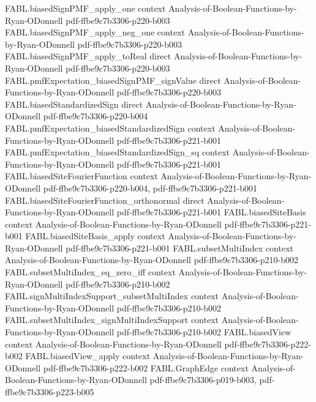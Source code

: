\begin{theorem}
\proofstep
  {FABL.biasedSignPMF_apply_one}
  {context}
  {Analysis-of-Boolean-Functions-by-Ryan-ODonnell}
  {pdf-ffbe9c7b3306-p220-b003}
\proofstep
  {FABL.biasedSignPMF_apply_neg_one}
  {context}
  {Analysis-of-Boolean-Functions-by-Ryan-ODonnell}
  {pdf-ffbe9c7b3306-p220-b003}
\proofstep
  {FABL.biasedSignPMF_apply_toReal}
  {direct}
  {Analysis-of-Boolean-Functions-by-Ryan-ODonnell}
  {pdf-ffbe9c7b3306-p220-b003}
\proofstep
  {FABL.pmfExpectation_biasedSignPMF_signValue}
  {direct}
  {Analysis-of-Boolean-Functions-by-Ryan-ODonnell}
  {pdf-ffbe9c7b3306-p220-b003}
\proofstep
  {FABL.biasedStandardizedSign}
  {direct}
  {Analysis-of-Boolean-Functions-by-Ryan-ODonnell}
  {pdf-ffbe9c7b3306-p220-b004}
\proofstep
  {FABL.pmfExpectation_biasedStandardizedSign}
  {context}
  {Analysis-of-Boolean-Functions-by-Ryan-ODonnell}
  {pdf-ffbe9c7b3306-p221-b001}
\proofstep
  {FABL.pmfExpectation_biasedStandardizedSign_sq}
  {context}
  {Analysis-of-Boolean-Functions-by-Ryan-ODonnell}
  {pdf-ffbe9c7b3306-p221-b001}
\proofstep
  {FABL.biasedSiteFourierFunction}
  {context}
  {Analysis-of-Boolean-Functions-by-Ryan-ODonnell}
  {pdf-ffbe9c7b3306-p220-b004,
    pdf-ffbe9c7b3306-p221-b001}
\proofstep
  {FABL.biasedSiteFourierFunction_orthonormal}
  {direct}
  {Analysis-of-Boolean-Functions-by-Ryan-ODonnell}
  {pdf-ffbe9c7b3306-p221-b001}
\proofstep
  {FABL.biasedSiteBasis}
  {context}
  {Analysis-of-Boolean-Functions-by-Ryan-ODonnell}
  {pdf-ffbe9c7b3306-p221-b001}
\proofstep
  {FABL.biasedSiteBasis_apply}
  {context}
  {Analysis-of-Boolean-Functions-by-Ryan-ODonnell}
  {pdf-ffbe9c7b3306-p221-b001}
\proofstep
  {FABL.subsetMultiIndex}
  {context}
  {Analysis-of-Boolean-Functions-by-Ryan-ODonnell}
  {pdf-ffbe9c7b3306-p210-b002}
\proofstep
  {FABL.subsetMultiIndex_eq_zero_iff}
  {context}
  {Analysis-of-Boolean-Functions-by-Ryan-ODonnell}
  {pdf-ffbe9c7b3306-p210-b002}
\proofstep
  {FABL.signMultiIndexSupport_subsetMultiIndex}
  {context}
  {Analysis-of-Boolean-Functions-by-Ryan-ODonnell}
  {pdf-ffbe9c7b3306-p210-b002}
\proofstep
  {FABL.subsetMultiIndex_signMultiIndexSupport}
  {context}
  {Analysis-of-Boolean-Functions-by-Ryan-ODonnell}
  {pdf-ffbe9c7b3306-p210-b002}
\proofstep
  {FABL.biasedView}
  {context}
  {Analysis-of-Boolean-Functions-by-Ryan-ODonnell}
  {pdf-ffbe9c7b3306-p222-b002}
\proofstep
  {FABL.biasedView_apply}
  {context}
  {Analysis-of-Boolean-Functions-by-Ryan-ODonnell}
  {pdf-ffbe9c7b3306-p222-b002}
\proofstep
  {FABL.GraphEdge}
  {context}
  {Analysis-of-Boolean-Functions-by-Ryan-ODonnell}
  {pdf-ffbe9c7b3306-p019-b003,
    pdf-ffbe9c7b3306-p223-b005}
\proofstep

\end{theorem}
